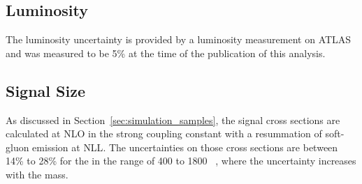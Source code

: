 \subsection{Luminosity}
The luminosity uncertainty is provided by a luminosity measurement on ATLAS and was measured to be 5\% at the time of the publication of this analysis.

\subsection{Signal Size}
As discussed in Section~\ref{sec:simulation_samples}, the signal cross sections are calculated at \ac{NLO} in the strong coupling constant with a resummation of soft-gluon emission at \ac{NLL}. 
The uncertainties on those cross sections are between 14\% to 28\% for the \rhadrons in the range of 400 to 1800 \GeV~\cite{Mackeprang:2006gx, Mackeprang:2009ad}, where the uncertainty increases with the mass.


